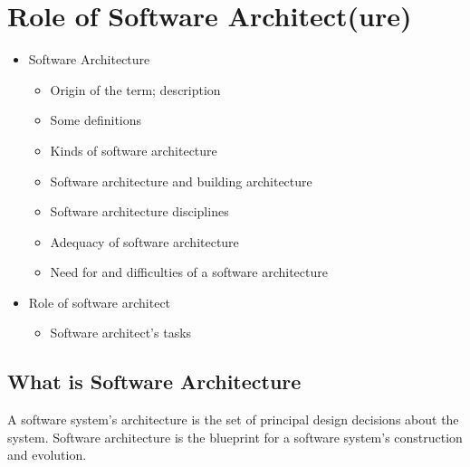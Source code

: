 \hypertarget{role-of-software-architecture}{%
\section{Role of Software
Architect(ure)}\label{role-of-software-architecture}}

\begin{tcolorbox}[colback=blue!5!white,colframe=blue!75!black]
\begin{itemize}
    \item Software Architecture
    \begin{itemize}
        \item Origin of the term; description
        \item Some definitions
        \item Kinds of software architecture
        \item Software architecture and building architecture
        \item Software architecture disciplines
        \item Adequacy of software architecture
        \item Need for and difficulties of a software architecture
    \end{itemize}
    \item Role of software architect
    \begin{itemize}
        \item Software architect’s tasks
    \end{itemize}
\end{itemize}
\end{tcolorbox}

\hypertarget{what-is-software-architecture}{%
\subsection{What is Software
Architecture}\label{what-is-software-architecture}}

A software system's architecture is the set of principal design
decisions about the system. Software architecture is the blueprint for a
software system's construction and evolution.

